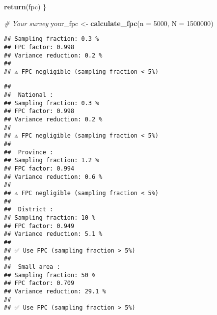 \documentclass[
]{article}
\newenvironment{Shaded}{\begin{snugshade}}{\end{snugshade}}
\newcommand{\AttributeTok}[1]{\textcolor[rgb]{0.13,0.29,0.53}{#1}}
\newcommand{\CommentTok}[1]{\textcolor[rgb]{0.56,0.35,0.01}{\textit{#1}}}
\newcommand{\ControlFlowTok}[1]{\textcolor[rgb]{0.13,0.29,0.53}{\textbf{#1}}}
\newcommand{\DecValTok}[1]{\textcolor[rgb]{0.00,0.00,0.81}{#1}}
\newcommand{\FunctionTok}[1]{\textcolor[rgb]{0.13,0.29,0.53}{\textbf{#1}}}
\newcommand{\NormalTok}[1]{#1}
\newcommand{\OtherTok}[1]{\textcolor[rgb]{0.56,0.35,0.01}{#1}}
\newcommand{\SpecialCharTok}[1]{\textcolor[rgb]{0.81,0.36,0.00}{\textbf{#1}}}
\newcommand{\StringTok}[1]{\textcolor[rgb]{0.31,0.60,0.02}{#1}}
\begin{document}
\begin{Shaded}
\begin{Highlighting}[]
  \FunctionTok{return}\NormalTok{(fpc)}
\NormalTok{\}}

\CommentTok{\# Your survey}
\NormalTok{your\_fpc }\OtherTok{\textless{}{-}} \FunctionTok{calculate\_fpc}\NormalTok{(}\AttributeTok{n =} \DecValTok{5000}\NormalTok{, }\AttributeTok{N =} \DecValTok{1500000}\NormalTok{)}
\end{Highlighting}
\end{Shaded}

\begin{verbatim}
## Sampling fraction: 0.3 %
## FPC factor: 0.998 
## Variance reduction: 0.2 %
## 
## ⚠️ FPC negligible (sampling fraction < 5%)
\end{verbatim}

\begin{Shaded}
\end{Shaded}

\begin{verbatim}
## 
##  National :
## Sampling fraction: 0.3 %
## FPC factor: 0.998 
## Variance reduction: 0.2 %
## 
## ⚠️ FPC negligible (sampling fraction < 5%)
## 
##  Province :
## Sampling fraction: 1.2 %
## FPC factor: 0.994 
## Variance reduction: 0.6 %
## 
## ⚠️ FPC negligible (sampling fraction < 5%)
## 
##  District :
## Sampling fraction: 10 %
## FPC factor: 0.949 
## Variance reduction: 5.1 %
## 
## ✅ Use FPC (sampling fraction > 5%)
## 
##  Small area :
## Sampling fraction: 50 %
## FPC factor: 0.709 
## Variance reduction: 29.1 %
## 
## ✅ Use FPC (sampling fraction > 5%)
\end{verbatim}
\end{document}
